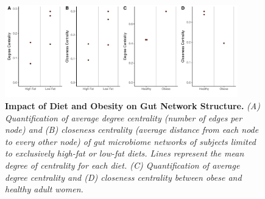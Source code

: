 \documentclass[12pt,]{article}
\begin{document}
\newpage

\begin{figure}[htbp]
\centering
\includegraphics[width=0.90000\textwidth]{../figures/dietnetworks.pdf}
\caption{\textbf{Impact of Diet and Obesity on Gut Network Structure.}
\emph{(A) Quantification of average degree centrality (number of edges
per node) and (B) closeness centrality (average distance from each node
to every other node) of gut microbiome networks of subjects limited to
exclusively high-fat or low-fat diets. Lines represent the mean degree
of centrality for each diet. (C) Quantification of average degree
centrality and (D) closeness centrality between obese and healthy adult
women.}\label{dietnetworks}}
\end{figure}

\newpage
\end{document}
